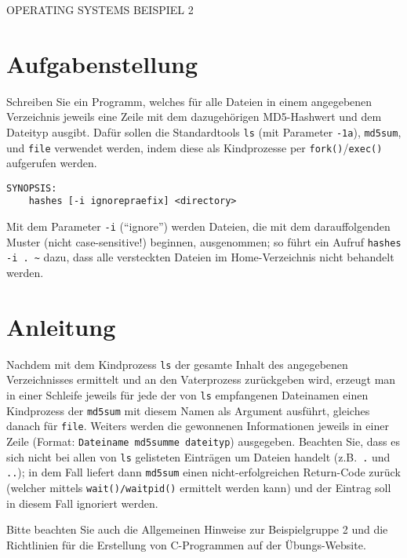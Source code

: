 \documentclass{article}
\begin{document}
\begin{center}
\begin{Large}
OPERATING SYSTEMS BEISPIEL 2
\end{Large}
\end{center}




\section*{Aufgabenstellung}

Schreiben Sie ein Programm, welches für alle Dateien in einem angegebenen
Verzeichnis jeweils eine Zeile mit dem dazugehörigen MD5-Hashwert und dem
Dateityp ausgibt. Dafür sollen die Standardtools \texttt{ls} (mit Parameter
\texttt{-1a}), \texttt{md5sum}, und \texttt{file} verwendet werden, indem
diese als Kindprozesse per \texttt{fork()}/\texttt{exec()} aufgerufen
werden.


\begin{verbatim}
SYNOPSIS:
	hashes [-i ignorepraefix] <directory>
\end{verbatim}

Mit dem Parameter \verb_-i_ (“ignore”) werden Dateien, die mit dem
darauffolgenden Muster (nicht case-sensitive!) beginnen, ausgenommen;
so führt ein Aufruf \verb_hashes -i . ~_ dazu, dass alle versteckten
Dateien im Home-Verzeichnis nicht behandelt werden.


\section*{Anleitung}
Nachdem mit dem Kindprozess \texttt{ls} der gesamte Inhalt des angegebenen
Verzeichnisses ermittelt und an den Vaterprozess zurückgeben wird, erzeugt man
in einer Schleife jeweils für jede der von \texttt{ls} empfangenen Dateinamen
einen Kindprozess der \texttt{md5sum} mit diesem Namen als Argument ausführt,
gleiches danach für \texttt{file}. Weiters werden die gewonnenen Informationen
jeweils in einer Zeile (Format: \texttt{Dateiname md5summe dateityp})
ausgegeben. Beachten Sie, dass es sich nicht bei allen von \texttt{ls}
gelisteten Einträgen um Dateien handelt (z.B.\ \texttt{.} und \texttt{..}); in dem Fall liefert dann
\texttt{md5sum} einen nicht-erfolgreichen Return-Code zurück (welcher
mittels \texttt{wait()/waitpid()} ermittelt werden kann) und der Eintrag soll in
diesem Fall ignoriert werden.

Bitte beachten Sie auch die Allgemeinen Hinweise zur
Beispielgruppe 2 und die Richtlinien für die Erstellung von
C-Programmen auf der Übungs-Website.
\end{document}

